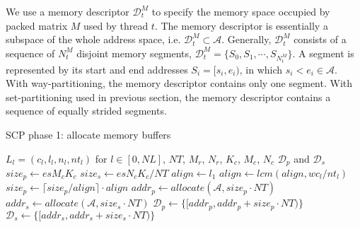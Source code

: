 We use a memory descriptor $\mathcal{D}_t^M$ to specify 
the memory space occupied by packed matrix $M$ used by thread $t$.
The memory descriptor is essentially a subspace of
the whole address space, i.e. $\mathcal{D}_t^M \subset \mathcal{A}$.
Generally, $\mathcal{D}_t^M$ consists of a sequence of $N_t^M$ disjoint memory segments,
$\mathcal{D}_t^M = \{ S_0, S_1, \cdots, S_{N_t^M}\}$.
A segment is represented by its start and end addresses $S_i = [s_i, e_i)$,
in which $s_i < e_i \in \mathcal{A}$.
With way-partitioning, the memory descriptor contains only one segment.
With set-partitioning used in previous section,
the memory descriptor contains a sequence of equally strided segments.

\begin{algorithm}
  \caption{SCP phase 1: allocate memory buffers}
  \label{alg:scp.phase1}
  \begin{algorithmic}[1]
    \REQUIRE $L_l = (c_l,l_l,n_l,nt_l)$ for $l \in [0, NL]$, $NT$,
    $M_r$, $N_r$, $K_c$, $M_c$, $N_c$
    \ENSURE $\mathcal{D}_p$ and $\mathcal{D}_s$
    \STATE $size_p \gets es M_c K_c$ \label{line:size.p}
    \STATE $size_s \gets es N_c K_c / NT$ \label{line:size.s}
    \STATE $align \gets l_1$ \label{line:align.init}
     \label{line:align.for}
     \label{line:align.type}
    \STATE $align \gets lcm(align, wc_l / nt_l)$ \label{line:align.update}
    \ENDIF
    \ENDFOR \label{line:align.endfor}
    \STATE $size_p \gets \lceil size_p / align \rceil \cdot align$ \label{line:align}
    \STATE $addr_p \gets allocate(\mathcal{A}, size_p \cdot NT)$ \label{line:alloc.begin}
    \STATE $addr_s \gets allocate(\mathcal{A}, size_s \cdot NT)$ \label{line:alloc.end}
    \STATE $\mathcal{D}_p \gets \lbrace [addr_p, addr_p + size_p \cdot NT) \rbrace$ \label{line:d.begin}
    \STATE $\mathcal{D}_s \gets \lbrace [addr_s, addr_s + size_s \cdot NT) \rbrace$ \label{line:d.end}
  \end{algorithmic}
\end{algorithm}

